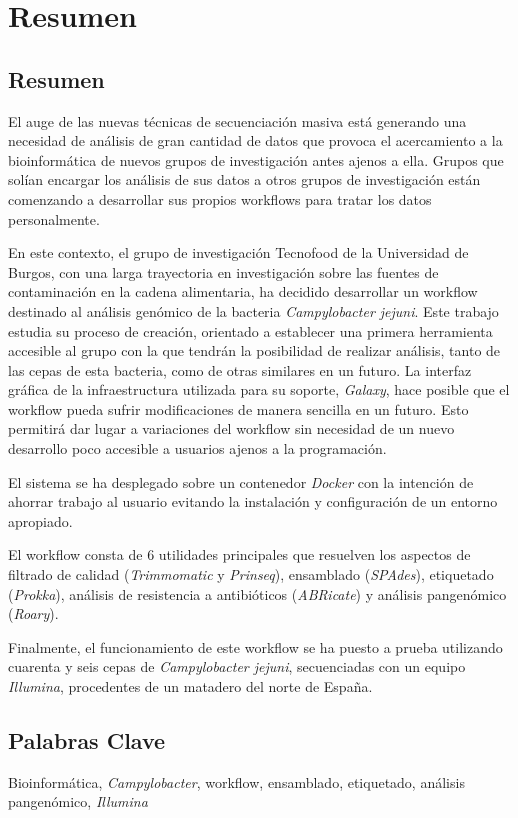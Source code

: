 \chapter*{Resumen}

\section*{Resumen}
El auge de las nuevas técnicas de secuenciación masiva está generando una necesidad de análisis de gran cantidad de datos que provoca el acercamiento a la bioinformática de nuevos grupos de investigación antes ajenos a ella. Grupos que solían encargar los análisis de sus datos a otros grupos de investigación están comenzando a desarrollar sus propios workflows para tratar los datos personalmente. 

En este contexto, el grupo de investigación Tecnofood de la Universidad de Burgos, con una larga trayectoria en investigación sobre las fuentes de contaminación en la cadena alimentaria, ha decidido desarrollar un workflow destinado al análisis genómico de la bacteria \textit{Campylobacter jejuni}. Este trabajo estudia su proceso de creación, orientado a establecer una primera herramienta accesible al grupo con la que tendrán la posibilidad de realizar análisis, tanto de las cepas de esta bacteria, como de otras similares en un futuro. La interfaz gráfica de la infraestructura utilizada para su soporte, \textit{Galaxy}, hace posible que el workflow pueda sufrir modificaciones de manera sencilla en un futuro. Esto permitirá dar lugar a variaciones del workflow sin necesidad de un nuevo desarrollo poco accesible a usuarios ajenos a la programación.

El sistema se ha desplegado sobre un contenedor \textit{Docker} con la intención de ahorrar trabajo al usuario evitando la instalación y configuración de un entorno apropiado.

El workflow consta de 6 utilidades principales que resuelven los aspectos de filtrado de calidad (\textit{Trimmomatic} y \textit{Prinseq}), ensamblado (\textit{SPAdes}), etiquetado (\textit{Prokka}), análisis de resistencia a antibióticos (\textit{ABRicate}) y análisis pangenómico (\textit{Roary}). 

Finalmente, el funcionamiento de este workflow se ha puesto a prueba utilizando cuarenta y seis cepas de \textit{Campylobacter jejuni}, secuenciadas con un equipo \textit{Illumina}, procedentes de un matadero del norte de España.

\section*{Palabras Clave}
Bioinformática, \textit{Campylobacter}, workflow, ensamblado, etiquetado, análisis pangenómico, \textit{Illumina}

